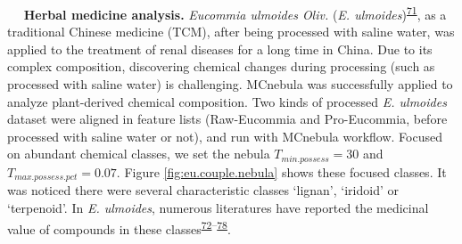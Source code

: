    \textbf{Herbal medicine analysis.} \emph{Eucommia ulmoides Oliv.}
(\emph{E. ulmoides})\textsuperscript{\protect\hyperlink{ref-2021n}{71}},
as a traditional Chinese medicine (TCM), after being processed with
saline water, was applied to the treatment of renal diseases for a long
time in China. Due to its complex composition, discovering chemical
changes during processing (such as processed with saline water) is
challenging. MCnebula was successfully applied to analyze plant-derived
chemical composition. Two kinds of processed \emph{E. ulmoides} dataset
were aligned in feature lists (Raw-Eucommia and Pro-Eucommia, before
processed with saline water or not), and run with MCnebula workflow.
Focused on abundant chemical classes, we set the nebula
\(T_{min.possess} = 30\) and \(T_{max.possess.pct} = 0.07\). Figure
{\protect\NoHyper\ref{fig:eu.couple.nebula}\protect\endNoHyper} shows
these focused classes. It was noticed there were several characteristic
classes `lignan', `iridoid' or `terpenoid'. In \emph{E. ulmoides},
numerous literatures have reported the medicinal value of compounds in
these
classes\textsuperscript{\protect\hyperlink{ref-2021cq}{72}--\protect\hyperlink{ref-2015q}{78}}.

